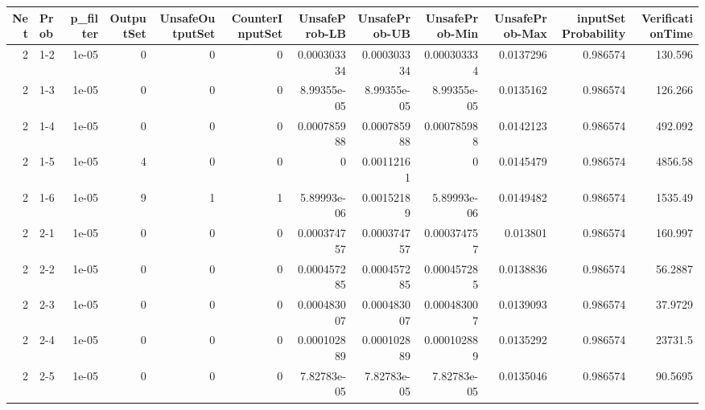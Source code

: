 \begin{tabular}{rlrrrrrrrrrr}
\hline
   Net & Prob   &   p\_filter &   OutputSet &   UnsafeOutputSet &   CounterInputSet &   UnsafeProb-LB &   UnsafeProb-UB &   UnsafeProb-Min &   UnsafeProb-Max &   inputSet Probability &   VerificationTime \\
\hline
     2 & 1-2    &      1e-05 &           0 &                 0 &                 0 &     0.000303334 &     0.000303334 &      0.000303334 &        0.0137296 &               0.986574 &           130.596  \\
     2 & 1-3    &      1e-05 &           0 &                 0 &                 0 &     8.99355e-05 &     8.99355e-05 &      8.99355e-05 &        0.0135162 &               0.986574 &           126.266  \\
     2 & 1-4    &      1e-05 &           0 &                 0 &                 0 &     0.000785988 &     0.000785988 &      0.000785988 &        0.0142123 &               0.986574 &           492.092  \\
     2 & 1-5    &      1e-05 &           4 &                 0 &                 0 &     0           &     0.00112161  &      0           &        0.0145479 &               0.986574 &          4856.58   \\
     2 & 1-6    &      1e-05 &           9 &                 1 &                 1 &     5.89993e-06 &     0.00152189  &      5.89993e-06 &        0.0149482 &               0.986574 &          1535.49   \\
     2 & 2-1    &      1e-05 &           0 &                 0 &                 0 &     0.000374757 &     0.000374757 &      0.000374757 &        0.013801  &               0.986574 &           160.997  \\
     2 & 2-2    &      1e-05 &           0 &                 0 &                 0 &     0.000457285 &     0.000457285 &      0.000457285 &        0.0138836 &               0.986574 &            56.2887 \\
     2 & 2-3    &      1e-05 &           0 &                 0 &                 0 &     0.000483007 &     0.000483007 &      0.000483007 &        0.0139093 &               0.986574 &            37.9729 \\
     2 & 2-4    &      1e-05 &           0 &                 0 &                 0 &     0.000102889 &     0.000102889 &      0.000102889 &        0.0135292 &               0.986574 &         23731.5    \\
     2 & 2-5    &      1e-05 &           0 &                 0 &                 0 &     7.82783e-05 &     7.82783e-05 &      7.82783e-05 &        0.0135046 &               0.986574 &            90.5695 \\
\hline
\end{tabular}
